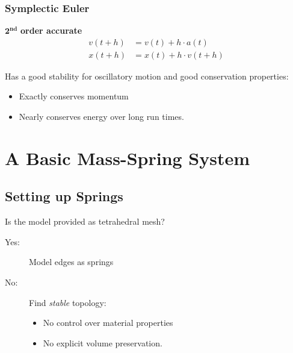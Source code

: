 \begin{multicols}{2}
\subsubsection{Symplectic Euler}
$\mathbf{2^{nd}}$ \textbf{order accurate}
\begin{align*}
	v(t+h) &= v(t) + h\cdot a(t)\\
	x(t+h) &= x(t) + h\cdot v(t+h)
\end{align*}

Has a good stability for oscillatory motion and good conservation properties:
\begin{itemize}
	\item Exactly conserves momentum
	\item Nearly conserves energy over long run times.
\end{itemize}

\section{A Basic Mass-Spring System}
\subsection{Setting up Springs}
Is the model provided as tetrahedral mesh?
\begin{description}
	\item[Yes:] Model edges as springs
	\item[No:] Find \emph{stable} topology:
		\begin{itemize}
			\item No control over material properties
			\item No explicit volume preservation.
		\end{itemize}
\end{description}


\end{multicols}
